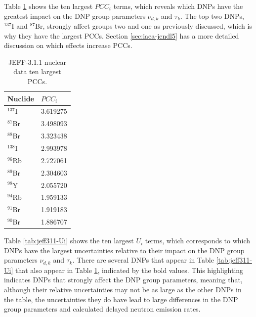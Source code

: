 Table \ref{tab:jeff311-PCCi} shows the ten largest $PCC_i$ terms, which reveals which \glspl{DNP} have the greatest impact on the \gls{DNP} group parameters $\nu_{d,k}$ and $\tau_k$.
The top two \glspl{DNP}, $^{137}$I and $^{87}$Br, strongly affect groups two and one as previously discussed, which is why they have the largest \glspl{PCC}.
Section \ref{sec:iaea-jendl5} has a more detailed discussion on which effects increase \glspl{PCC}.


\begin{table}[]
    \centering
    \caption{JEFF-3.1.1 nuclear data ten largest \glspl{PCC}.}
    \begin{tabular}{ll}
        \hline
       Nuclide & $PCC_{i}$ \\
       \hline
       $^{137}$I & 3.619275 \\
       $^{87}$Br & 3.498093 \\
       $^{88}$Br & 3.323438 \\
       $^{138}$I & 2.993978 \\
       $^{96}$Rb & 2.727061 \\
       $^{89}$Br & 2.304603 \\
       $^{98}$Y & 2.055720 \\
       $^{94}$Rb & 1.959133 \\
       $^{91}$Br & 1.919183 \\
       $^{90}$Br & 1.886707 \\
        \hline
    \end{tabular}
    \label{tab:jeff311-PCCi}
\end{table}

Table \ref{tab:jeff311-Ui} shows the ten largest $U_i$ terms, which corresponds to which \glspl{DNP} have the largest uncertainties relative to their impact on the \gls{DNP} group parameters $\nu_{d,k}$ and $\tau_k$.
There are several \glspl{DNP} that appear in Table \ref{tab:jeff311-Ui} that also appear in Table \ref{tab:jeff311-PCCi}, indicated by the bold values.
This highlighting indicates \glspl{DNP} that strongly affect the \gls{DNP} group parameters, meaning that, although their relative uncertainties may not be as large as the other \glspl{DNP} in the table, the uncertainties they do have lead to large differences in the \gls{DNP} group parameters and calculated delayed neutron emission rates.

